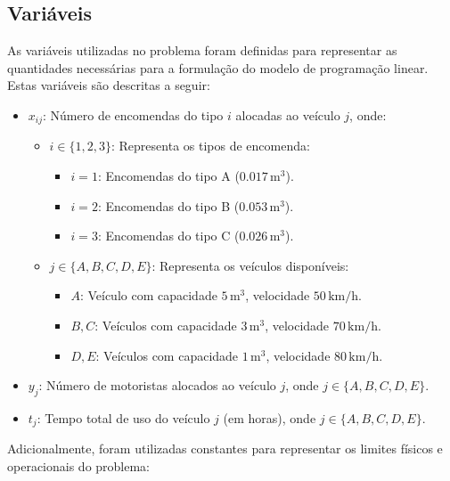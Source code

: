 \subsection{Variáveis}\label{subsec:variaveis}
As variáveis utilizadas no problema foram definidas para representar as quantidades necessárias para a formulação do modelo de programação linear.
Estas variáveis são descritas a seguir:
\begin{itemize}
    \item \( x_{ij} \): Número de encomendas do tipo \( i \) alocadas ao veículo \( j \), onde:
    \begin{itemize}
        \item \( i \in \{1, 2, 3\} \): Representa os tipos de encomenda:
        \begin{itemize}
            \item \( i = 1 \): Encomendas do tipo A (\(0.017 \, \mathrm{m^3}\)).
            \item \( i = 2 \): Encomendas do tipo B (\(0.053 \, \mathrm{m^3}\)).
            \item \( i = 3 \): Encomendas do tipo C (\(0.026 \, \mathrm{m^3}\)).
        \end{itemize}
        \item \( j \in \{A, B, C, D, E\} \): Representa os veículos disponíveis:
        \begin{itemize}
            \item \( A \): Veículo com capacidade \( 5 \, \mathrm{m^3} \), velocidade \( 50 \, \mathrm{km/h} \).
            \item \( B, C \): Veículos com capacidade \( 3 \, \mathrm{m^3} \), velocidade \( 70 \, \mathrm{km/h} \).
            \item \( D, E \): Veículos com capacidade \( 1 \, \mathrm{m^3} \), velocidade \( 80 \, \mathrm{km/h} \).
        \end{itemize}
    \end{itemize}
    \item \( y_j \): Número de motoristas alocados ao veículo \( j \), onde \( j \in \{A, B, C, D, E\} \).
    \item \( t_j \): Tempo total de uso do veículo \( j \) (em horas), onde \( j \in \{A, B, C, D, E\} \).
\end{itemize}
Adicionalmente, foram utilizadas constantes para representar os limites físicos e operacionais do problema:
